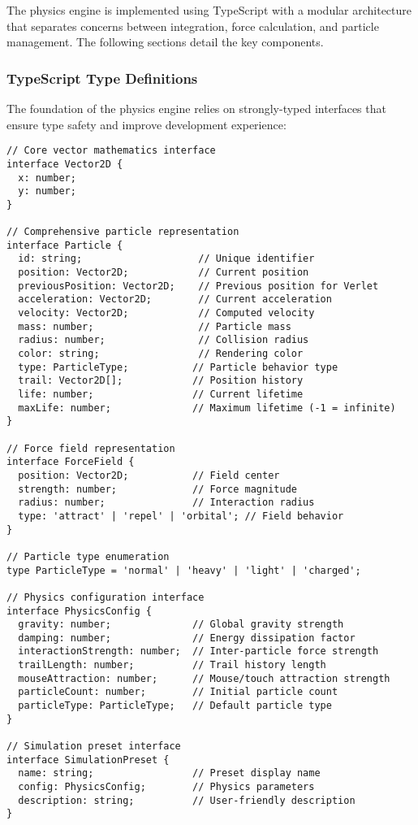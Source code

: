 \documentclass[12pt,journal,onecolumn]{IEEEtran}
\begin{document}
The physics engine is implemented using TypeScript with a modular architecture that separates concerns between integration, force calculation, and particle management. The following sections detail the key components.

\subsubsection{TypeScript Type Definitions}

The foundation of the physics engine relies on strongly-typed interfaces that ensure type safety and improve development experience:

\begin{verbatim}
// Core vector mathematics interface
interface Vector2D {
  x: number;
  y: number;
}

// Comprehensive particle representation
interface Particle {
  id: string;                    // Unique identifier
  position: Vector2D;            // Current position
  previousPosition: Vector2D;    // Previous position for Verlet
  acceleration: Vector2D;        // Current acceleration
  velocity: Vector2D;            // Computed velocity
  mass: number;                  // Particle mass
  radius: number;                // Collision radius
  color: string;                 // Rendering color
  type: ParticleType;           // Particle behavior type
  trail: Vector2D[];            // Position history
  life: number;                 // Current lifetime
  maxLife: number;              // Maximum lifetime (-1 = infinite)
}

// Force field representation
interface ForceField {
  position: Vector2D;           // Field center
  strength: number;             // Force magnitude
  radius: number;               // Interaction radius
  type: 'attract' | 'repel' | 'orbital'; // Field behavior
}

// Particle type enumeration
type ParticleType = 'normal' | 'heavy' | 'light' | 'charged';

// Physics configuration interface
interface PhysicsConfig {
  gravity: number;              // Global gravity strength
  damping: number;              // Energy dissipation factor
  interactionStrength: number;  // Inter-particle force strength
  trailLength: number;          // Trail history length
  mouseAttraction: number;      // Mouse/touch attraction strength
  particleCount: number;        // Initial particle count
  particleType: ParticleType;   // Default particle type
}

// Simulation preset interface
interface SimulationPreset {
  name: string;                 // Preset display name
  config: PhysicsConfig;        // Physics parameters
  description: string;          // User-friendly description
}
\end{verbatim}
\end{document}
